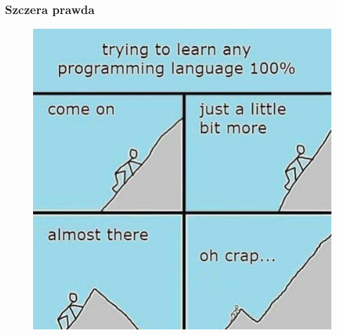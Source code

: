 \documentclass[10pt,t]{beamer}
\begin{document}
\begin{frame}
  \frametitle{Szczera prawda}

  \vspace{-0.5em}


  \begin{figure}

    \label{fig:Learning-any-language-at-100-procent}

    \centering


    \includegraphics[scale=0.195]
    {./Presentations-pictures/Learning-language-at-100.jpg}

  \end{figure}

\end{frame}
\end{document}
